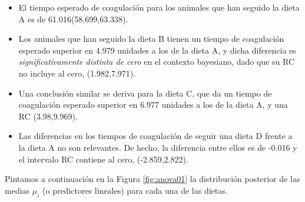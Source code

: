 \documentclass[
]{book}
\providecommand{\tightlist}{%
  \setlength{\itemsep}{0pt}\setlength{\parskip}{0pt}}
\begin{document}
\begin{itemize}
\tightlist
\item
  El tiempo esperado de coagulación para los animales que han seguido la dieta A es de 61.016(58.699,63.338).
\item
  Los animales que han seguido la dieta B tienen un tiempo de coagulación esperado superior en 4.979 unidades a los de la dieta A, y dicha diferencia es \emph{significativamente distinta de cero} en el contexto bayesiano, dado que su RC no incluye al cero, (1.982,7.971).
\item
  Una conclusión similar se deriva para la dieta C, que da un tiempo de coagulación esperado superior en 6.977 unidades a los de la dieta A, y una RC (3.98,9.969).
\item
  Las diferencias en los tiempos de coagulación de seguir una dieta D frente a la dieta A no son relevantes. De hecho, la diferencia entre ellos es de -0.016 y el intervalo RC contiene al cero, (-2.859,2.822).
\end{itemize}

Pintamos a continuación en la Figura \ref{fig:anova01} la distribución posterior de las medias \(\mu_i\) (o predictores lineales) para cada una de las dietas.
\end{document}
